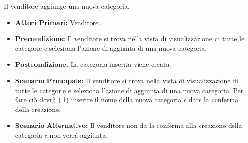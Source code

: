 
Il venditore aggiunge una nuova categoria.
\begin{itemize}
    \item \textbf{Attori Primari:} Venditore.
    \item \textbf{Precondizione:} Il venditore si trova nella vista di visualizzazione di tutte le categorie e seleziona l'azione di aggiunta di una nuova categoria.
    \item \textbf{Postcondizione:} La categoria inserita viene creata.
    \item \textbf{Scenario Principale:} Il venditore si trova nella vista di visualizzazione di tutte le categorie e seleziona l'azione di aggiunta di una nuova categoria. Per fare ciò dovrà (\actualUC.1) inserire il nome della nuova categoria e dare la conferma della creazione.
    \item \textbf{Scenario Alternativo:} Il venditore non da la conferma alla creazione della categoria e non verrà aggiunta.
\end{itemize}

\resetSubUC

